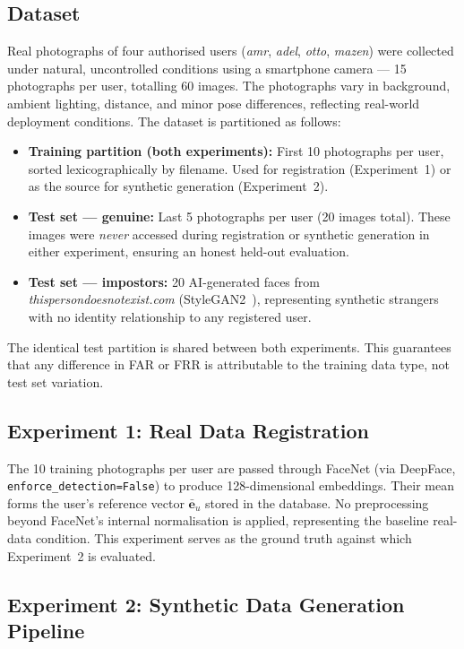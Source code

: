 \documentclass[conference]{IEEEtran}
\begin{document}
\subsection{Dataset}

Real photographs of four authorised users (\textit{amr}, \textit{adel}, \textit{otto}, \textit{mazen}) were collected under natural, uncontrolled conditions using a smartphone camera — 15 photographs per user, totalling 60 images. The photographs vary in background, ambient lighting, distance, and minor pose differences, reflecting real-world deployment conditions. The dataset is partitioned as follows:

\begin{itemize}
    \item \textbf{Training partition (both experiments):} First 10 photographs per user, sorted lexicographically by filename. Used for registration (Experiment~1) or as the source for synthetic generation (Experiment~2).
    \item \textbf{Test set — genuine:} Last 5 photographs per user (20 images total). These images were \textit{never} accessed during registration or synthetic generation in either experiment, ensuring an honest held-out evaluation.
    \item \textbf{Test set — impostors:} 20 AI-generated faces from \textit{thispersondoesnotexist.com} (StyleGAN2~\cite{karras2020stylegan2}), representing synthetic strangers with no identity relationship to any registered user.
\end{itemize}

The identical test partition is shared between both experiments. This guarantees that any difference in FAR or FRR is attributable to the training data type, not test set variation.

\subsection{Experiment 1: Real Data Registration}

The 10 training photographs per user are passed through FaceNet (via DeepFace, \texttt{enforce\_detection=False}) to produce 128-dimensional embeddings. Their mean forms the user's reference vector $\bar{\mathbf{e}}_u$ stored in the database. No preprocessing beyond FaceNet's internal normalisation is applied, representing the baseline real-data condition. This experiment serves as the ground truth against which Experiment~2 is evaluated.

\subsection{Experiment 2: Synthetic Data Generation Pipeline}
\end{document}
